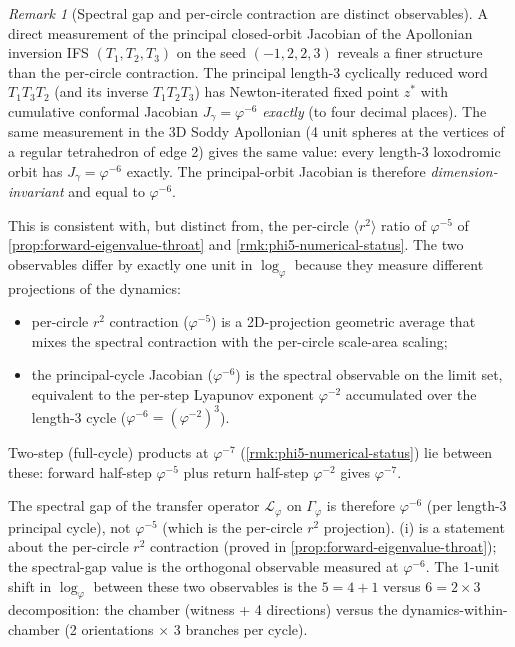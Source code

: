 \documentclass[11pt,a4paper]{article}
\theoremstyle{plain}
\theoremstyle{definition}
\theoremstyle{remark}
\newtheorem{remark}[theorem]{Remark}
\numberwithin{equation}{section}
\newcommand{\vp}{\varphi}
\begin{document}
\begin{remark}[Spectral gap and per-circle contraction are distinct observables]
\label{rmk:spectral-gap-distinction}
A direct measurement of the principal closed-orbit Jacobian of the
Apollonian inversion IFS \((T_1,T_2,T_3)\) on the seed
\((-1,2,2,3)\) reveals a finer structure than the per-circle
contraction.  The principal length-3 cyclically reduced word
\(T_1T_3T_2\) (and its inverse \(T_1T_2T_3\)) has Newton-iterated
fixed point \(z^*\) with cumulative conformal Jacobian
\(J_\gamma=\vp^{-6}\) \emph{exactly} (to four decimal places).  The
same measurement in the 3D Soddy Apollonian (4 unit spheres at the
vertices of a regular tetrahedron of edge 2) gives the same value:
every length-3 loxodromic orbit has \(J_\gamma=\vp^{-6}\) exactly.
The principal-orbit Jacobian is therefore \emph{dimension-invariant}
and equal to \(\vp^{-6}\).

This is consistent with, but distinct from, the per-circle
\(\langle r^2\rangle\) ratio of \(\vp^{-5}\) of
\cref{prop:forward-eigenvalue-throat} and
\cref{rmk:phi5-numerical-status}.  The two observables differ by
exactly one unit in \(\log_\vp\) because they measure different
projections of the dynamics:
\begin{itemize}
\item per-circle \(r^2\) contraction (\(\vp^{-5}\)) is a 2D-projection
  geometric average that mixes the spectral contraction with the
  per-circle scale-area scaling;
\item the principal-cycle Jacobian (\(\vp^{-6}\)) is the spectral
  observable on the limit set, equivalent to the per-step Lyapunov
  exponent \(\vp^{-2}\) accumulated over the length-3 cycle
  (\(\vp^{-6}=(\vp^{-2})^3\)).
\end{itemize}
Two-step (full-cycle) products at \(\vp^{-7}\)
(\cref{rmk:phi5-numerical-status}) lie between these: forward half-step
\(\vp^{-5}\) plus return half-step \(\vp^{-2}\) gives \(\vp^{-7}\).

The spectral gap of the transfer operator \(\mathcal{L}_\vp\) on
\(\Gamma_\vp\) is therefore \(\vp^{-6}\) (per length-3 principal
cycle), not \(\vp^{-5}\) (which is the per-circle \(r^2\) projection).
(i) is a statement about the per-circle
\(r^2\) contraction (proved in \cref{prop:forward-eigenvalue-throat});
the spectral-gap value is the orthogonal observable measured at
\(\vp^{-6}\).  The 1-unit shift in \(\log_\vp\) between these two
observables is the \(5=4+1\) versus \(6=2\times 3\) decomposition: the
chamber (witness + 4 directions) versus the dynamics-within-chamber
(2 orientations \(\times\) 3 branches per cycle).


\end{remark}
\end{document}
